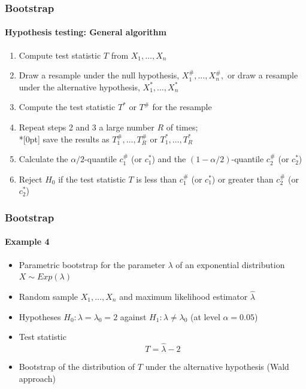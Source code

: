 \documentclass[smaller,compress]{beamer}
\begin{document}
\begin{frame}\frametitle{Bootstrap}\framesubtitle{Hypothesis testing: General algorithm}
\begin{enumerate}
    \item Compute test statistic $T$ from $X_{1},\ldots ,X_{n}$
    \item Draw a resample under the null hypothesis, $X_{1}^{\#},\ldots,X_{n}^{\#},$ or draw a resample under the alternative hypothesis, $X_{1}^{\ast },\ldots ,X_{n}^{\ast }$
    \item Compute the test statistic $T^{\ast }$ or $T^{\#}$ for the resample
    \item Repeat steps 2 and 3 a large number $R$ of times;\\*[0pt]
    save the results as $T_{1}^{\#},\ldots ,T_{R}^{\#}$ or $T_{1}^{\ast },\ldots,T_{R}^{\ast }$
    \item Calculate the $\alpha /2$-quantile $c_{1}^{\#}$ (or $c_{1}^{\ast }$) and the \newline
    $\left( 1-\alpha /2\right) $-quantile $c_{2}^{\#}$ (or $c_{2}^{\ast }$)
    \item Reject $H_{0}$ if the test statistic $T$ is less than $c_{1}^{\#}$ (or $c_{1}^{\ast }$) or greater than $c_{2}^{\#}$ (or $c_{2}^{\ast }$)
\end{enumerate}
\end{frame}


\begin{frame}\frametitle{Bootstrap}\framesubtitle{Example 4}
\begin{itemize}
    \item Parametric bootstrap for the parameter $\lambda $ of an exponential distribution $X\sim Exp(\lambda )$
    \item Random sample $X_{1},\ldots ,X_{n}$ and maximum likelihood estimator $\hat{\lambda}$
    \item Hypotheses $H_{0}:\lambda =\lambda _{0}=2$ against $H_{1}:\lambda \neq \lambda _{0}$
    (at level $\alpha =0.05$)
    \item Test statistic
    \begin{equation*}
    T=\hat{\lambda}-2
    \end{equation*}
    \item Bootstrap of the distribution of $T$ under the alternative hypothesis (Wald approach)\hspace*{\fill}{\tiny bootex4a.R}
\end{itemize}
\end{frame}
\end{document}
